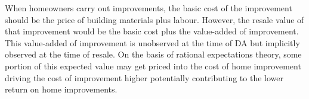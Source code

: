 \documentclass[AEJ,reqno, draftmode]{AEA} %
\begin{document}

When homeowners carry out improvements, the basic cost of the improvement should be the price of building materials plus labour. However, the resale value of that improvement would be the basic cost plus the value-added of improvement. This value-added of improvement is unobserved at the time of DA but implicitly observed at the time of resale. On the basis of rational expectations theory, some portion of this expected value may get priced into the cost of home improvement driving the cost of improvement higher potentially contributing to the lower return on home improvements. %




\end{document}
